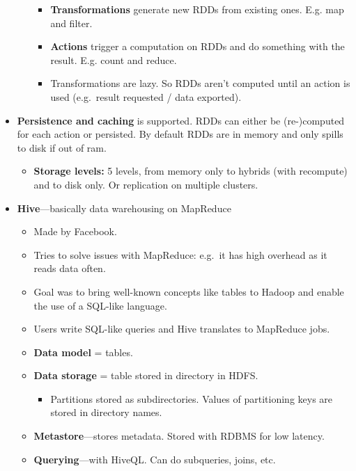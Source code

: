 \begin{multicols}{2}
\begin{itemize}
\begin{itemize}
    \begin{itemize}
        \item
      \textbf{Transformations} generate new RDDs from existing ones.
      E.g. map and filter.
    \item
      \textbf{Actions} trigger a computation on RDDs and do something
      with the result. E.g. count and reduce.
    \item
      Transformations are lazy. So RDDs aren't computed until an action
      is used (e.g.~result requested / data exported).
    \end{itemize}
  \end{itemize}
\item
  \textbf{Persistence and caching} is supported. RDDs can either be
  (re-)computed for each action or persisted. By default RDDs are in
  memory and only spills to disk if out of ram.

  \begin{itemize}
    \item
    \textbf{Storage levels:} 5 levels, from memory only to hybrids (with
    recompute) and to disk only. Or replication on multiple clusters.
  \end{itemize}
\item
  \textbf{Hive}---basically data warehousing on MapReduce

  \begin{itemize}
    \item
    Made by Facebook.
  \item
    Tries to solve issues with MapReduce: e.g.~it has high overhead as
    it reads data often.
  \item
    Goal was to bring well-known concepts like tables to Hadoop and
    enable the use of a SQL-like language.
  \item
    Users write SQL-like queries and Hive translates to MapReduce jobs.
  \item
    \textbf{Data model} = tables.
  \item
    \textbf{Data storage} = table stored in directory in HDFS.

    \begin{itemize}
        \item
      Partitions stored as subdirectories. Values of partitioning keys
      are stored in directory names.
    \end{itemize}
  \item
    \textbf{Metastore}---stores metadata. Stored with RDBMS for low
    latency.
  \item
    \textbf{Querying}---with HiveQL. Can do subqueries, joins, etc.
  \end{itemize}
\end{itemize}
\end{multicols}